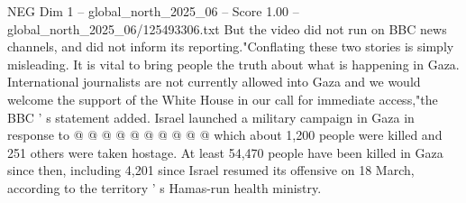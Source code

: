 \begin{textsample}{NEG Dim 1 – global\_north\_2025\_06 – Score 1.00 – global\_north\_2025\_06/125493306.txt}
But the video did not run on BBC news channels, and did not inform its reporting."Conflating these two stories is simply misleading.
It is vital to bring people the truth about what is happening in Gaza.
International journalists are not currently allowed into Gaza and we would welcome the support of the White House in our call for immediate access,"the BBC ' s statement added.
Israel launched a military campaign in Gaza in response to @ @ @ @ @ @ @ @ @ @ which about 1,200 people were killed and 251 others were taken hostage.
At least 54,470 people have been killed in Gaza since then, including 4,201 since Israel resumed its offensive on 18 March, according to the territory ' s Hamas-run health ministry.

\end{textsample}
